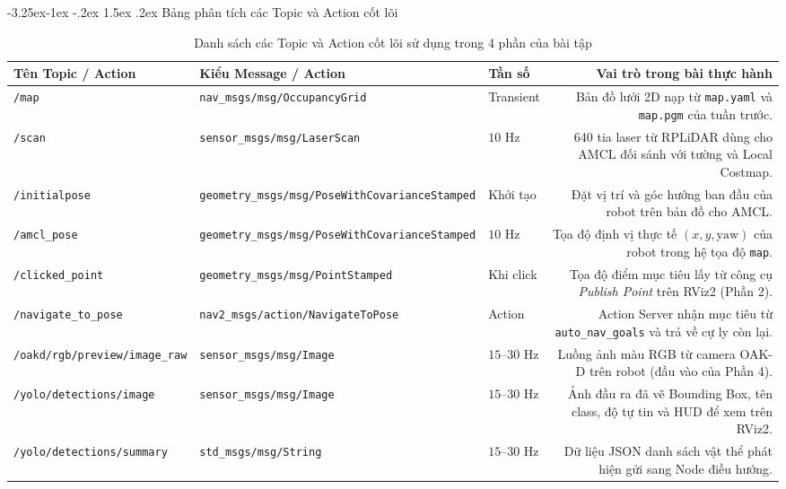 \documentclass[11pt,a4paper]{article}
\makeatletter
\renewcommand{\subsection}{\@startsection{subsection}{2}{\z@}%
  {-3.25ex\@plus -1ex \@minus -.2ex}%
  {1.5ex \@plus .2ex}%
  {\normalfont\normalsize\bfseries\color{secondary}}}
\makeatother
\begin{document}
\subsection{Bảng phân tích các Topic và Action cốt lõi}
\begin{table}[H]
\centering
\footnotesize
\setlength{\tabcolsep}{4pt}
\begin{tabularx}{\textwidth}{L{3.7cm}L{4.3cm}L{1.4cm}R}
\toprule
\textbf{\color{primary}Tên Topic / Action} & \textbf{\color{primary}Kiểu Message / Action} & \textbf{\color{primary}Tần số} & \textbf{\color{primary}Vai trò trong bài thực hành} \\
\midrule
\texttt{/map} & \texttt{nav\_msgs/msg/}\newline\texttt{OccupancyGrid} & Transient & Bản đồ lưới 2D nạp từ \texttt{map.yaml} và \texttt{map.pgm} của tuần trước. \\
\texttt{/scan} & \texttt{sensor\_msgs/msg/}\newline\texttt{LaserScan} & $10\text{ Hz}$ & 640 tia laser từ RPLiDAR dùng cho AMCL đối sánh với tường và Local Costmap. \\
\texttt{/initialpose} & \texttt{geometry\_msgs/msg/}\newline\texttt{PoseWithCovarianceStamped} & Khởi tạo & Đặt vị trí và góc hướng ban đầu của robot trên bản đồ cho AMCL. \\
\texttt{/amcl\_pose} & \texttt{geometry\_msgs/msg/}\newline\texttt{PoseWithCovarianceStamped} & $10\text{ Hz}$ & Tọa độ định vị thực tế $(x, y, \text{yaw})$ của robot trong hệ tọa độ \texttt{map}. \\
\texttt{/clicked\_point} & \texttt{geometry\_msgs/msg/}\newline\texttt{PointStamped} & Khi click & Tọa độ điểm mục tiêu lấy từ công cụ \textit{Publish Point} trên RViz2 (Phần 2). \\
\texttt{/navigate\_to\_pose} & \texttt{nav2\_msgs/action/}\newline\texttt{NavigateToPose} & Action & Action Server nhận mục tiêu từ \texttt{auto\_nav\_goals} và trả về cự ly còn lại. \\
\texttt{/oakd/rgb/preview/}\newline\texttt{image\_raw} & \texttt{sensor\_msgs/msg/Image} & $15\text{--}30\text{ Hz}$ & Luồng ảnh màu RGB từ camera OAK-D trên robot (đầu vào của Phần 4). \\
\texttt{/yolo/detections/}\newline\texttt{image} & \texttt{sensor\_msgs/msg/Image} & $15\text{--}30\text{ Hz}$ & Ảnh đầu ra đã vẽ Bounding Box, tên class, độ tự tin và HUD để xem trên RViz2. \\
\texttt{/yolo/detections/}\newline\texttt{summary} & \texttt{std\_msgs/msg/String} & $15\text{--}30\text{ Hz}$ & Dữ liệu JSON danh sách vật thể phát hiện gửi sang Node điều hướng. \\
\bottomrule
\end{tabularx}
\caption{Danh sách các Topic và Action cốt lõi sử dụng trong 4 phần của bài tập}
\label{tab:topics}
\end{table}
\end{document}
